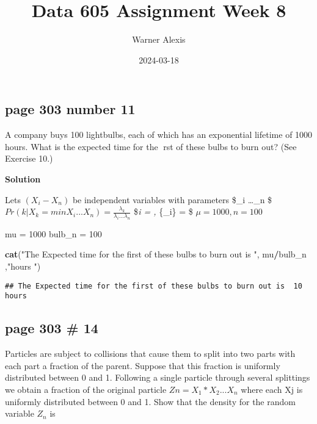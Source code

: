 \documentclass[
]{article}
\title{Data 605 Assignment Week 8}
\author{Warner Alexis}
\date{2024-03-18}
\newenvironment{Shaded}{\begin{snugshade}}{\end{snugshade}}
\newcommand{\DecValTok}[1]{\textcolor[rgb]{0.00,0.00,0.81}{#1}}
\newcommand{\FunctionTok}[1]{\textcolor[rgb]{0.13,0.29,0.53}{\textbf{#1}}}
\newcommand{\NormalTok}[1]{#1}
\newcommand{\OtherTok}[1]{\textcolor[rgb]{0.56,0.35,0.01}{#1}}
\newcommand{\SpecialCharTok}[1]{\textcolor[rgb]{0.81,0.36,0.00}{\textbf{#1}}}
\newcommand{\StringTok}[1]{\textcolor[rgb]{0.31,0.60,0.02}{#1}}
\begin{document}
\maketitle

\hypertarget{page-303-number-11}{%
\subsection{page 303 number 11}\label{page-303-number-11}}

A company buys 100 lightbulbs, each of which has an exponential lifetime
of 1000 hours. What is the expected time for the rst of these bulbs to
burn out? (See Exercise 10.)

\textbf{Solution}

Lets \((X_i - X_n)\) be independent variables with parameters
\$\lambda\_i \ldots{}\lambda\_n \$
\(Pr(k|X_k = minX_i...X_n) = \frac {\lambda_k}{\lambda_i ...\lambda_n}\)
\$\lambda\emph{i = , \sum}\{\lambda\_i\} = \$
\(\mu = 1000, n = 100\)

\begin{Shaded}
\begin{Highlighting}[]
\NormalTok{mu }\OtherTok{=} \DecValTok{1000}
\NormalTok{bulb\_n }\OtherTok{=} \DecValTok{100}

\FunctionTok{cat}\NormalTok{(}\StringTok{"The Expected time for the first of these bulbs to burn out is "}\NormalTok{, mu}\SpecialCharTok{/}\NormalTok{bulb\_n ,}\StringTok{"hours "}\NormalTok{)}
\end{Highlighting}
\end{Shaded}

\begin{verbatim}
## The Expected time for the first of these bulbs to burn out is  10 hours
\end{verbatim}

\hypertarget{page-303-14}{%
\subsection{page 303 \# 14}\label{page-303-14}}

Particles are subject to collisions that cause them to split into two
parts with each part a fraction of the parent. Suppose that this
fraction is uniformly distributed between 0 and 1. Following a single
particle through several splittings we obtain a fraction of the original
particle \(Zn = X_1*X_2...X_n\) where each Xj is uniformly distributed
between 0 and 1. Show that the density for the random variable \(Z_n\)
is
\end{document}
